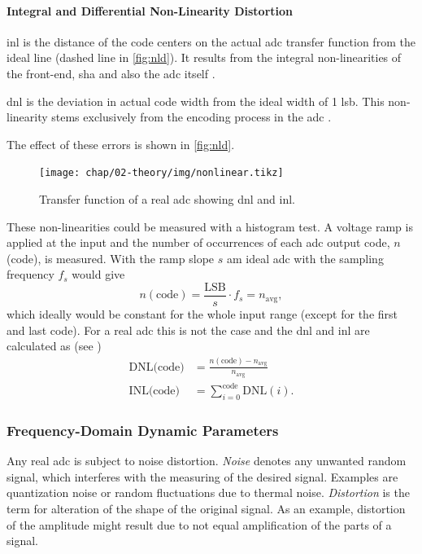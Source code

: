 
\paragraph{Integral and Differential Non-Linearity Distortion} 
\gls{inl} is the distance of the code centers on the actual \gls{adc} transfer function from the ideal line (dashed line in \autoref{fig:nld}). %
It results from the integral non-linearities of the front-end, \gls{sha} and also the \gls{adc} itself \cite{walt, Lundberg}. 

\gls{dnl} is the deviation in actual code width from the ideal width of 1 \gls{lsb}. This non-linearity stems exclusively from the encoding process in the \gls{adc} \cite{Lundberg,walt} . 

The effect of these errors is shown in \autoref{fig:nld}.
\begin{figure}[tbh]
	\centering
	\texttt{[image: chap/02-theory/img/nonlinear.tikz]}
	\caption[ADC Nonlinearities]{Transfer function of a real \gls{adc} showing \gls{dnl} and \gls{inl}.\cite{Lundberg}}
	\label{fig:nld}
\end{figure}

These non-linearities could be measured with a histogram test.
A voltage ramp is applied at the input and the number of occurrences of each \gls{adc} output code, $n$(code), is measured.
With the ramp slope $s$ am ideal \gls{adc} with the sampling frequency $f_s$ would give
\begin{equation}
	n(\text{code}) = \frac{\text{LSB}}{s} \cdot f_s = n_\text{avg},
\end{equation}
which ideally would be constant for the whole input range (except for the first and last code).
For a real \gls{adc} this is not the case and the \gls{dnl} and \gls{inl} are calculated as (see \cite{inlDnl})
\begin{align}
	\text{DNL(code)} &= \frac{n(\text{code})-n_\text{avg}}{n_\text{avg}}\\
	\text{INL(code)} &= \sum_{i = 0}^{\text{code}} \text{DNL}(i).
\end{align}


\subsubsection{Frequency-Domain Dynamic Parameters}
Any real \gls{adc} is subject to noise distortion. 
\textit{Noise} denotes any unwanted random signal, which interferes with the measuring of the desired signal. 
Examples are quantization noise or random fluctuations due to thermal noise. 
\textit{Distortion} is the term for alteration of the shape of the original signal. 
As an example, distortion of the amplitude might result due to not equal amplification of the parts of a signal. \cite{nd}

